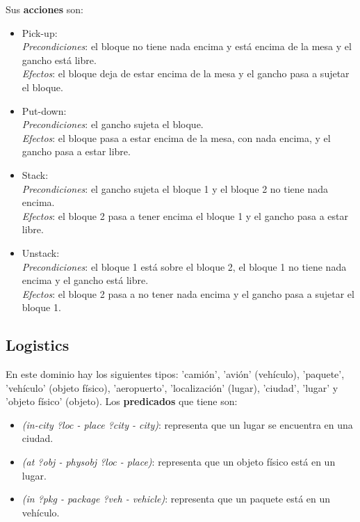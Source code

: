 \documentclass{uc3mpracticas}
\begin{document}
  Sus \textbf{acciones} son:
  \begin{itemize}
    \item Pick-up:
    \\\textit{Precondiciones}: el bloque no tiene nada encima y está encima de la mesa y el gancho está libre.
    \\\textit{Efectos}: el bloque deja de estar encima de la mesa y el gancho pasa a sujetar el bloque.
    \item Put-down:
    \\\textit{Precondiciones}: el gancho sujeta el bloque.
    \\\textit{Efectos}: el bloque pasa a estar encima de la mesa, con nada encima, y el gancho pasa a estar libre.
    \item Stack:
    \\\textit{Precondiciones}: el gancho sujeta el bloque 1 y el bloque 2 no tiene nada encima.
    \\\textit{Efectos}: el bloque 2 pasa a tener encima el bloque 1 y el gancho pasa a estar libre.
    \item Unstack:
    \\\textit{Precondiciones}: el bloque 1 está sobre el bloque 2, el bloque 1 no tiene nada encima y el gancho está libre.
    \\\textit{Efectos}: el bloque 2 pasa a no tener nada encima y el gancho pasa a sujetar el bloque 1.
  \end{itemize}



  \subsection{Logistics}

  En este dominio hay los siguientes tipos: 'camión', 'avión' (vehículo), 'paquete', 'vehículo' (objeto físico), 'aeropuerto', 'localización' (lugar), 'ciudad', 'lugar' y 'objeto físico' (objeto). Los \textbf{predicados} que tiene son:
  \begin{itemize}
    \item \textit{(in-city ?loc - place ?city - city)}: representa que un lugar se encuentra en una ciudad.
  	\item \textit{(at ?obj - physobj ?loc - place)}: representa que un objeto físico está en un lugar.
  	\item \textit{(in ?pkg - package ?veh - vehicle)}: representa que un paquete está en un vehículo.
  \end{itemize}
\end{document}
